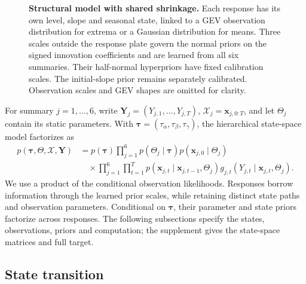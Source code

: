 \documentclass[11pt,a4paper]{article}
\begin{document}
\begin{figure}[!htbp]
\caption{\textbf{Structural model with shared shrinkage.}
Each response has its own level, slope and seasonal state, linked to a
GEV observation distribution for extrema or a Gaussian distribution for
means. Three scales outside the response plate govern the normal priors
on the signed innovation coefficients and are learned from all six
summaries. Their half-normal hyperpriors have fixed calibration scales.
The initial-slope prior remains separately calibrated. Observation
scales and GEV shapes are omitted for clarity.}
\label{fig:state_space_model_structural}
\end{figure}

For summary \(j=1,\ldots,6\), write
\(\bm Y_j=(Y_{j,1},\ldots,Y_{j,T})\),
\(\mathcal X_j=\bm x_{j,0:T}\), and let \(\Theta_j\) contain its
static parameters. With
\(\bm\tau=(\tau_\alpha,\tau_\beta,\tau_\gamma)\), the hierarchical
state-space model factorizes as \citep{sarkka2013}
\begin{equation}\label{eq:ssm}
\begin{aligned}
p(\bm\tau,\Theta,\mathcal X,\bm Y)
&=p(\bm\tau)\prod_{j=1}^{6}
 p(\Theta_j\mid\bm\tau)p(\bm x_{j,0}\mid\Theta_j)\\[-1mm]
&\quad{}\times\prod_{j=1}^{6}\prod_{t=1}^{T}
 p(\bm x_{j,t}\mid\bm x_{j,t-1},\Theta_j)
 g_{j,t}(Y_{j,t}\mid\bm x_{j,t},\Theta_j).
\end{aligned}
\end{equation}
We use a product of the conditional observation likelihoods. Responses
borrow information through the learned prior scales, while retaining
distinct state paths and observation parameters. Conditional on
\(\bm\tau\), their parameter and state priors factorize across responses.
The following subsections specify the states, observations, priors and
computation; the supplement gives the state-space matrices and full target.

	\subsection{State transition}
	\label{subsec::an_interpretable_evolving_location}
	
\end{document}
